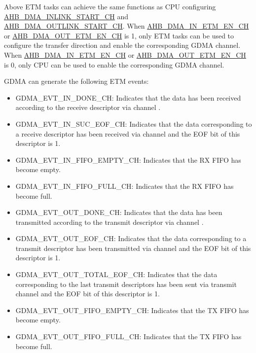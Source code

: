 \documentclass[main\_\_EN.tex]{subfiles}
\begin{document}
\begin{tiplisting}
Above ETM tasks can achieve the same functions as CPU configuring \hyperref[fielddesc:AHBDMAINLINKSTARTCHN]{AHB\_DMA\_INLINK\_START\_CH} and \\\hyperref[fielddesc:AHBDMAOUTLINKSTARTCHN]{AHB\_DMA\_OUTLINK\_START\_CH}. When \hyperref[fielddesc:AHBDMAINETMENCHN]{AHB\_DMA\_IN\_ETM\_EN\_CH}  or \hyperref[fielddesc:AHBDMAOUTETMENCHN]{AHB\_DMA\_OUT\_ETM\_EN\_CH} is 1, only ETM tasks can be used to configure the transfer direction and enable the corresponding GDMA channel. When \hyperref[fielddesc:AHBDMAINETMENCHN]{AHB\_DMA\_IN\_ETM\_EN\_CH} or \hyperref[fielddesc:AHBDMAOUTETMENCHN]{AHB\_DMA\_OUT\_ETM\_EN\_CH} is 0, only CPU can be used to enable the corresponding GDMA channel.
\end{tiplisting}

GDMA can generate the following ETM events:

\begin{itemize}
    \item GDMA\_EVT\_IN\_DONE\_CH: Indicates that the data has been received according to the receive descriptor via channel .
    \item GDMA\_EVT\_IN\_SUC\_EOF\_CH: Indicates that the data corresponding to a receive descriptor has been received via channel  and the EOF bit of this descriptor is 1.
    \item GDMA\_EVT\_IN\_FIFO\_EMPTY\_CH: Indicates that the RX FIFO has become empty.
    \item GDMA\_EVT\_IN\_FIFO\_FULL\_CH: Indicates that the RX FIFO has become full.
    \item GDMA\_EVT\_OUT\_DONE\_CH: Indicates that the data has been transmitted according to the transmit descriptor via channel .
    \item GDMA\_EVT\_OUT\_EOF\_CH: Indicates that the data corresponding to a transmit descriptor has been transmitted via channel  and the EOF bit of this descriptor is 1.
    \item GDMA\_EVT\_OUT\_TOTAL\_EOF\_CH: Indicates that the data corresponding to the last transmit descriptors has been sent via transmit channel  and the EOF bit of this descriptor is 1.
    \item GDMA\_EVT\_OUT\_FIFO\_EMPTY\_CH: Indicates that the TX FIFO has become empty.
    \item GDMA\_EVT\_OUT\_FIFO\_FULL\_CH: Indicates that the TX FIFO has become full.
\end{itemize}
\end{document}
